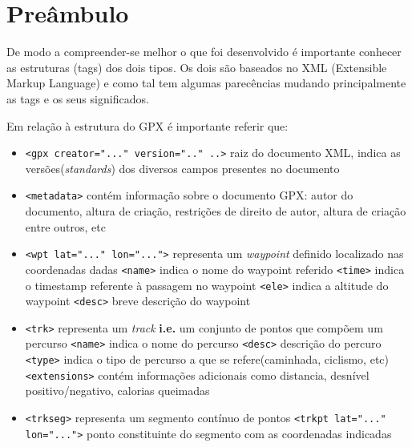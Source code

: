 \documentclass{llncs}
\begin{document}
\section{Preâmbulo}\label{pb}
De modo a compreender-se melhor o que foi desenvolvido é importante conhecer as estruturas (tags) dos dois tipos. Os dois são baseados no XML (Extensible Markup Language) e como tal tem algumas parecências mudando principalmente as tags e os seus significados. 

Em relação à estrutura do GPX é importante referir que:
\begin{itemize}
    \item \verb|<gpx creator="..." version=".." ..>| raiz do documento XML, indica as versões(\textit{standards}) dos diversos campos presentes no documento
    \item \verb|<metadata>| contém informação sobre o documento GPX: autor do documento, altura de criação, restrições de direito de autor, altura de criação entre outros, etc
    \item \verb|<wpt lat="..." lon="...">| representa um \textit{waypoint} definido  localizado nas coordenadas dadas
        \subitem \verb|<name>| indica o nome do waypoint referido
        \subitem \verb|<time>| indica o timestamp referente à passagem no waypoint
        \subitem \verb|<ele>| indica a altitude do waypoint
        \subitem \verb|<desc>| breve descrição do waypoint
    \item \verb|<trk>| representa um \textit{track} \textbf{i.e.} um conjunto de pontos que compõem um percurso
        \subitem \verb|<name>| indica o nome do percurso
        \subitem \verb|<desc>| descrição do percuro
        \subitem \verb|<type>| indica o tipo de percurso a que se refere(caminhada, ciclismo, etc)
        \subitem \verb|<extensions>| contém informações adicionais como distancia, desnível positivo/negativo, calorias queimadas
    \item \verb|<trkseg>| representa um segmento contínuo de pontos
        \subitem \verb|<trkpt lat="..." lon="...">| ponto constituinte do segmento com as coordenadas indicadas
\end{itemize}
\end{document}
